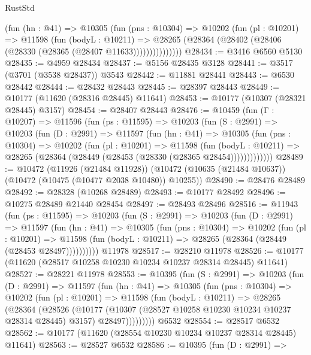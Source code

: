 \begin{lexlean}{RustStd}
\begin{coremodule}
              (fun (hn : @41) =>
              @10305
                (fun (pns : @10304) =>
                @10202
                  (fun (pl : @10201) =>
                  @11598
                    (fun (bodyL : @10211) =>
                    @28265 (@28364 (@28402 (@28406 (@28330 (@28365 (@28407 @11633)))))))))))))))
@28434 := @3416 @6560 @5130
@28435 := @4959 @28434
@28437 := @5156 @28435 @3128
@28441 := @3517 (@3701 (@3538 @28437)) @3543
@28442 := @11881 @28441
@28443 := @6530 @28442
@28444 := @28432 @28443
@28445 := @28397 @28443
@28449 := @10177 (@11620 (@28316 @28445) @11641)
@28453 := @10177 (@10307 (@28321 @28445) @3157)
@28454 := @28407 @28443
@28476 := @10459
    (fun (Γ : @10207) =>
    @11596
      (fun (ps : @11595) =>
      @10203
        (fun (S : @2991) =>
        @10203
          (fun (D : @2991) =>
          @11597
            (fun (hn : @41) =>
            @10305
              (fun (pns : @10304) =>
              @10202
                (fun (pl : @10201) =>
                @11598
                  (fun (bodyL : @10211) =>
                  @28265 (@28364 (@28449 (@28453 (@28330 (@28365 @28454)))))))))))))
@28489 := @10472
    (@11926 (@21484 @11928))
    (@10472 (@10635 (@21484 @10637)) (@10472 (@10475 (@10477 @2038 @10480)) @10255))
@28490 := @28476 @28489
@28492 := @28328 (@10268 @28489)
@28493 := @10177 @28492
@28496 := @10275 @28489 @21440 @28454
@28497 := @28493 @28496
@28516 := @11943
    (fun (ps : @11595) =>
    @10203
      (fun (S : @2991) =>
      @10203
        (fun (D : @2991) =>
        @11597
          (fun (hn : @41) =>
          @10305
            (fun (pns : @10304) =>
            @10202
              (fun (pl : @10201) =>
              @11598 (fun (bodyL : @10211) => @28265 (@28364 (@28449 (@28453 @28497))))))))))
    @11978
@28517 := @28210 @11978
@28526 := @10177 (@11620 (@28517 @10258 @10230 @10234 @10237 @28314 @28445) @11641)
@28527 := @28221 @11978
@28553 := @10395
    (fun (S : @2991) =>
    @10203
      (fun (D : @2991) =>
      @11597
        (fun (hn : @41) =>
        @10305
          (fun (pns : @10304) =>
          @10202
            (fun (pl : @10201) =>
            @11598
              (fun (bodyL : @10211) =>
              @28265
                (@28364
                  (@28526
                    (@10177
                      (@10307 (@28527 @10258 @10230 @10234 @10237 @28314 @28445) @3157)
                      @28497)))))))))
    @6532
@28554 := @28517 @6532
@28562 := @10177 (@11620 (@28554 @10230 @10234 @10237 @28314 @28445) @11641)
@28563 := @28527 @6532
@28586 := @10395
    (fun (D : @2991) =>

\end{coremodule}
\end{lexlean}
